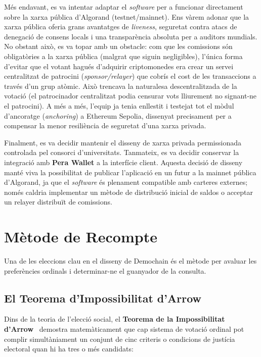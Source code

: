 Més endavant, es va intentar adaptar el \textit{software} per a funcionar directament sobre la xarxa pública d'Algorand
(testnet/mainnet).
Ens vàrem adonar que la xarxa pública oferia grans avantatges de \textit{liveness}, seguretat contra atacs de denegació
de consens locals i una transparència absoluta per a auditors mundials.
No obstant això, es va topar amb un obstacle: com que les comissions són obligatòries a la xarxa pública (malgrat que
siguin negligibles), l'única forma d'evitar que el votant hagués d'adquirir criptomonedes era crear un servei
centralitzat de patrocini (\textit{sponsor/relayer}) que cobrís el cost de les transaccions a través d'un grup atòmic.
Això trencava la naturalesa descentralitzada de la votació (el patrocinador centralitzat podia censurar vots lliurement
no signant-ne el patrocini).
A més a més, l'equip ja tenia enllestit i testejat tot el mòdul d'ancoratge (\textit{anchoring}) a Ethereum Sepolia,
dissenyat precisament per a compensar la menor resiliència de seguretat d'una xarxa privada.

Finalment, es va decidir mantenir el disseny de xarxa privada permissionada controlada pel consorci d'universitats.
Tanmateix, es va decidir conservar la integració amb \textbf{Pera Wallet} a la interfície client.
Aquesta decisió de disseny manté viva la possibilitat de publicar l'aplicació en un futur a la mainnet pública
d'Algorand, ja que el \textit{software} és plenament compatible amb carteres externes; només caldria implementar un
mètode de distribució inicial de saldos o acceptar un relayer distribuït de comissions.


\section{Mètode de Recompte}
\label{sec:metode-recompte}

Una de les eleccions clau en el disseny de Demochain és el mètode per avaluar les preferències ordinals i determinar-ne
el guanyador de la consulta.

\subsection{El Teorema d'Impossibilitat d'Arrow}
\label{subsec:teorema-arrow}

Dins de la teoria de l'elecció social, el \textbf{Teorema de la Impossibilitat d'Arrow}~\cite{arrow1963socialchoice} demostra matemàticament que cap
sistema de votació ordinal pot complir simultàniament un conjunt de cinc criteris o condicions de justícia electoral
quan hi ha tres o més candidats:

